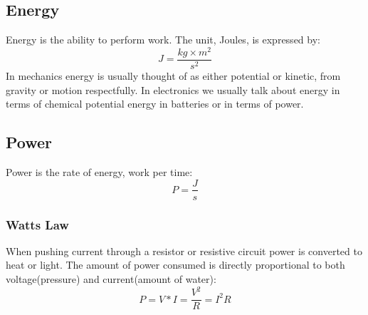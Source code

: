 \subsection{Energy}
Energy is the ability to perform work. The unit, Joules, is expressed by:
\begin{equation}
    J = \frac{kg \times m^2}{s^2}
\end{equation}
In mechanics energy is usually thought of as either potential or kinetic, from 
gravity or motion respectfully. In electronics we usually talk about energy in 
terms of chemical potential energy in batteries or in terms of power.
\subsection{Power}
Power is the rate of energy, work per time:
\begin{equation}
    P = \frac{J}{s}
\end{equation}
\subsubsection{Watts Law}
When pushing current through a resistor or resistive circuit power is converted
to heat or light. The amount of power consumed is directly proportional to both 
voltage(pressure) and current(amount of water):
\begin{equation}
    P = V*I = \frac{V^2}{R} = I^2R
\end{equation}